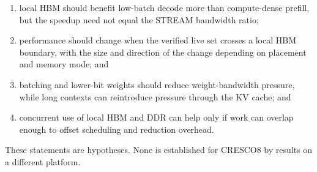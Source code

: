 \begin{enumerate}
  \item local HBM should benefit low-batch decode more than compute-dense
        prefill, but the speedup need not equal the STREAM bandwidth
        ratio;
  \item performance should change when the verified live set crosses a
        local HBM boundary, with the size and direction of the change
        depending on placement and memory mode; and
  \item batching and lower-bit weights should reduce weight-bandwidth
        pressure, while long contexts can reintroduce pressure through
        the KV cache; and
  \item concurrent use of local HBM and DDR can help only if work can
        overlap enough to offset scheduling and reduction overhead.
\end{enumerate}

These statements are hypotheses.  None is established for CRESCO8 by
results on a different platform.
